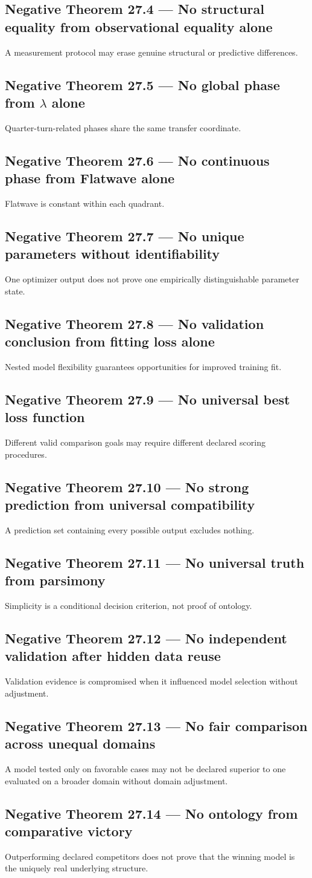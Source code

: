 \documentclass[11pt,oneside,openany]{book}
\newcommand{\PCsubsection}[1]{%
  \subsection*{#1}%
}
\begin{document}
\PCsubsection{Negative Theorem 27.4 --- No structural equality from observational equality alone}

A measurement protocol may erase genuine structural or predictive differences.

\PCsubsection{Negative Theorem 27.5 --- No global phase from \(\lambda\) alone}

Quarter-turn-related phases share the same transfer coordinate.

\PCsubsection{Negative Theorem 27.6 --- No continuous phase from Flatwave alone}

Flatwave is constant within each quadrant.

\PCsubsection{Negative Theorem 27.7 --- No unique parameters without identifiability}

One optimizer output does not prove one empirically distinguishable parameter state.

\PCsubsection{Negative Theorem 27.8 --- No validation conclusion from fitting loss alone}

Nested model flexibility guarantees opportunities for improved training fit.

\PCsubsection{Negative Theorem 27.9 --- No universal best loss function}

Different valid comparison goals may require different declared scoring procedures.

\PCsubsection{Negative Theorem 27.10 --- No strong prediction from universal compatibility}

A prediction set containing every possible output excludes nothing.

\PCsubsection{Negative Theorem 27.11 --- No universal truth from parsimony}

Simplicity is a conditional decision criterion, not proof of ontology.

\PCsubsection{Negative Theorem 27.12 --- No independent validation after hidden data reuse}

Validation evidence is compromised when it influenced model selection without adjustment.

\PCsubsection{Negative Theorem 27.13 --- No fair comparison across unequal domains}

A model tested only on favorable cases may not be declared superior to one evaluated on a broader domain without domain adjustment.

\PCsubsection{Negative Theorem 27.14 --- No ontology from comparative victory}

Outperforming declared competitors does not prove that the winning model is the uniquely real underlying structure.
\end{document}
